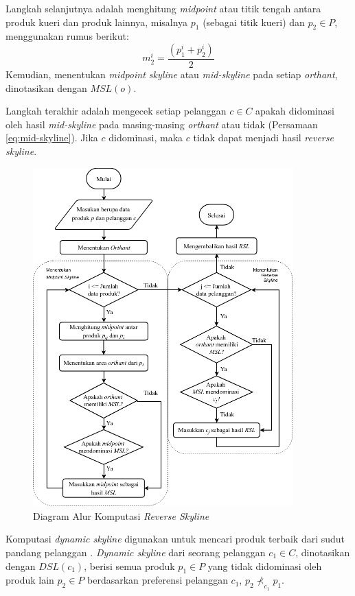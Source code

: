 Langkah selanjutnya adalah menghitung \textit{midpoint} atau titik tengah antara produk kueri dan produk lainnya, misalnya $p_1$ (sebagai titik kueri) dan $p_2 \in P$, menggunakan rumus berikut: 
\begin{equation} \label{eq:midpoint2}
m_2^i = \frac{(p_1^i + p_2^i)}{2}
\end{equation}
Kemudian, menentukan \textit{midpoint skyline} atau \textit{mid-skyline} \cite{mid-skyline} pada setiap \textit{orthant}, dinotasikan dengan $MSL(o)$.

Langkah terakhir adalah mengecek setiap pelanggan $c \in C$ apakah didominasi oleh hasil \textit{mid-skyline} pada masing-masing \textit{orthant} atau tidak (Persamaan \ref{eq:mid-skyline}). Jika $c$ didominasi, maka $c$ tidak dapat menjadi hasil \textit{reverse skyline}.

\begin{figure}[H]
	\centering
	\includegraphics[width=10cm]{assets/img/bab3/flowchart-rsl.png}
	\caption{Diagram Alur Komputasi \textit{Reverse Skyline}}
	\label{fig:flowchart-rsl}
\end{figure}

\pagebreak
{}

Komputasi \textit{dynamic skyline} digunakan untuk mencari produk terbaik dari sudut pandang pelanggan \cite{kmpp}. \textit{Dynamic skyline} \cite{dynamic-skyline} dari seorang pelanggan $c_1 \in C$, dinotasikan dengan $DSL(c_1)$, berisi semua produk $p_1 \in P$ yang tidak didominasi oleh produk lain $p_2 \in P$ berdasarkan preferensi pelanggan $c_1$, $p_2 \nprec_{c_1} p_1$. 

